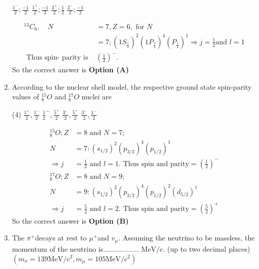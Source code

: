 \begin{enumerate}
\begin{tasks}
\task[\textbf{A.}] $\frac{1^{-}}{2} ; \frac{-1}{2}$
\task[\textbf{B.}] $\frac{1^{+}}{2} ; \frac{-1}{2}$
\task[\textbf{C.}] $\frac{3^{+}}{2} ; \frac{1}{2}$
\task[\textbf{D.}] $\frac{3^{-}}{2} ; \frac{-1}{2}$
\end{tasks}
\begin{answer}
\begin{align*}
{ }^{13} C_{6}, \quad N&=7, Z=6,\text{ for }N\\&=7 ;\left(1 S_{\frac{1}{2}}\right)^{2}\left(1 P_{\frac{3}{2}}\right)^{4}\left(P_{\frac{1}{2}}\right)^{1} \Rightarrow j=\frac{1}{2} \text{and }l=1\\
\text{	Thus spin- parity is }&\left(\frac{1}{2}\right)^{-}.
\end{align*}
So the correct answer is \textbf{Option (A)}
\end{answer}
\item According to the nuclear shell model, the respective ground state spin-parity values of ${ }_{8}^{15} O$ and ${ }_{8}^{17} O$ nuclei are
{}
\begin{tasks}(4)
\task[\textbf{A.}] $\frac{1^{+}}{2}, \frac{1^{-}}{2}$
\task[\textbf{B.}] $\frac{1}{2}^{-}, \frac{5^{+}}{2}$
\task[\textbf{C.}] $\frac{3^{-}}{2}, \frac{5^{+}}{2}$
\task[\textbf{D.}] $\frac{3^{-}}{2}, \frac{1^{-}}{2}$
\end{tasks}
\begin{answer}
\begin{align*}
{ }_{8}^{15} O ; Z&=8\text{ and }N=7 ; \\ N&=7:\left(s_{1 / 2}\right)^{2}\left(p_{3 / 2}\right)^{4}\left(p_{1 / 2}\right)^{1}\\
\Rightarrow j&=\frac{1}{2}\text{ and }l=1 .\text{ Thus spin and parity} =\left(\frac{1}{2}\right)^{-}\\
{ }_{8}^{17} O ; Z&=8\text{ and }N=9 ; \\ N&=9:\left(s_{1 / 2}\right)^{2}\left(p_{3 / 2}\right)^{4}\left(p_{1 / 2}\right)^{2}\left(d_{5 / 2}\right)^{1}\\
\Rightarrow j&=\frac{5}{2}\text{ and }l=2.\text{ Thus spin and parity} =\left(\frac{5}{2}\right)^{+}
\end{align*}
So the correct answer is \textbf{Option (B)}
\end{answer}
\item The $\pi^{+}$decays at rest to $\mu^{+}$and $v_{\mu}$. Assuming the neutrino to be massless, the momentum of the neutrino is.................. $\mathrm{MeV} / \mathrm{c}$. (up to two decimal places)\\ $\left(m_{\pi}=139 \mathrm{MeV} / \mathrm{c}^{2}, m_{\mu}=105 \mathrm{MeV} / \mathrm{c}^{2}\right)$

\end{enumerate}
